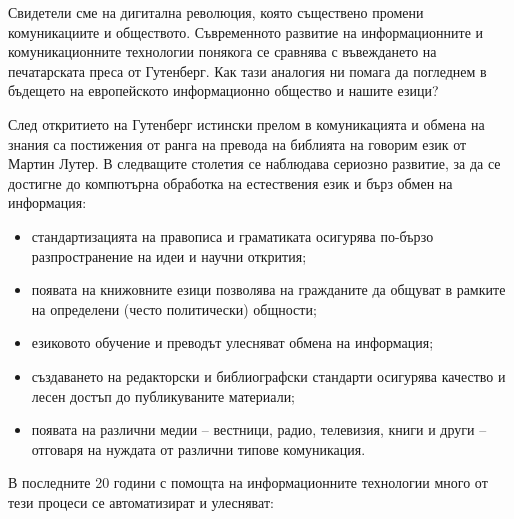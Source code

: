   \clearpage


  \begin{multicols}{2}

  Свидетели сме на дигитална революция, която съществено промени комуникациите и обществото. Съвременното развитие на информационните и  комуникационните технологии понякога се сравнява с въвеждането на печатарската преса от Гутенберг. Как тази аналогия ни помага да погледнем в бъдещето на европейското информационно общество и нашите езици?


  След откритието на Гутенберг истински прелом в комуникацията и обмена на знания са постижения от ранга на превода на библията на говорим език от Мартин Лутер. В следващите
   столетия се наблюдава сериозно развитие, за да се достигне до компютърна
  обработка на естествения език и бърз обмен на информация:

  \begin{itemize}
  \item стандартизацията на правописа и граматиката осигурява по-бързо разпространение на идеи и научни открития;
  \item появата на книжовните езици позволява на гражданите да общуват в рамките на определени  (често политически) общности;
  \item езиковото обучение и преводът улесняват обмена на информация;
  \item  създаването на редакторски и библиографски стандарти осигурява качество и лесен достъп до публикуваните материали;
  \item появата на различни медии -- вестници, радио, телевизия, книги и други -- отговаря на нуждата от различни типове комуникация.
  \end{itemize}

  В последните 20 години с помощта на информационните технологии много от тези процеси се автоматизират и улесняват:


\end{multicols}
